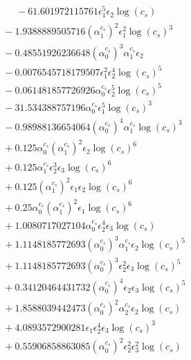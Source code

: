 \documentclass[10pt]{article}
\begin{document}
\begin{align*}
\phantom{F_{s,6}} &\phantom{={}}{}  - 61.601972115761 \epsilon_{1}^{5} \epsilon_{2} \log{\left(c_{s} \right)} \\
&{}  - 1.9388889505716 \left(\alpha_{1}^{c_s}\right)^{2} \epsilon_{1}^{2} \log{\left(c_{s} \right)}^{3} \\
&{}  - 0.48551926236648 \left(\alpha_{0}^{c_s}\right)^{3} \alpha_{1}^{c_s} \epsilon_{2} \\
&{}  - 0.0076545718179507 \epsilon_{1}^{2} \epsilon_{2}^{4} \log{\left(c_{s} \right)}^{5} \\
&{}  - 0.061481857726926 \alpha_{0}^{c_s} \epsilon_{2}^{5} \log{\left(c_{s} \right)}^{5} \\
&{}  - 31.534388757196 \alpha_{0}^{c_s} \epsilon_{1}^{5} \log{\left(c_{s} \right)}^{3} \\
&{}  - 0.98988136654064 \left(\alpha_{0}^{c_s}\right)^{4} \alpha_{1}^{c_s} \log{\left(c_{s} \right)}^{3} \\
&{}  + 0.125 \alpha_{0}^{c_s} \left(\alpha_{1}^{c_s}\right)^{2} \epsilon_{2} \log{\left(c_{s} \right)}^{6} \\
&{}  + 0.125 \alpha_{1}^{c_s} \epsilon_{2}^{3} \epsilon_{3} \log{\left(c_{s} \right)}^{6} \\
&{}  + 0.125 \left(\alpha_{1}^{c_s}\right)^{2} \epsilon_{1} \epsilon_{2} \log{\left(c_{s} \right)}^{6} \\
&{}  + 0.25 \alpha_{0}^{c_s} \left(\alpha_{1}^{c_s}\right)^{2} \epsilon_{1} \log{\left(c_{s} \right)}^{6} \\
&{}  + 1.0080717027104 \alpha_{0}^{c_s} \epsilon_{2}^{4} \epsilon_{3} \log{\left(c_{s} \right)} \\
&{}  + 1.1148185772693 \left(\alpha_{0}^{c_s}\right)^{3} \alpha_{1}^{c_s} \epsilon_{2} \log{\left(c_{s} \right)}^{5} \\
&{}  + 1.1148185772693 \left(\alpha_{0}^{c_s}\right)^{3} \epsilon_{2}^{2} \epsilon_{3} \log{\left(c_{s} \right)}^{5} \\
&{}  + 0.34120464431732 \left(\alpha_{0}^{c_s}\right)^{4} \epsilon_{2} \epsilon_{3} \log{\left(c_{s} \right)}^{5} \\
&{}  + 1.8588039442473 \left(\alpha_{0}^{c_s}\right)^{2} \alpha_{2}^{c_s} \epsilon_{2} \log{\left(c_{s} \right)} \\
&{}  + 4.0893572900281 \epsilon_{1} \epsilon_{2}^{4} \epsilon_{3} \log{\left(c_{s} \right)}^{3} \\
&{}  + 0.55906858863085 \left(\alpha_{0}^{c_s}\right)^{2} \epsilon_{2}^{2} \epsilon_{3}^{2} \log{\left(c_{s} \right)} \\

\end{align*}
\end{document}
